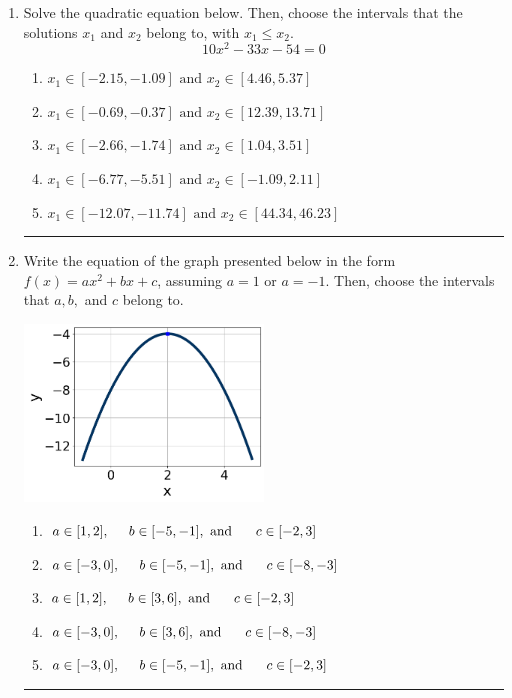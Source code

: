 \documentclass[14pt]{extbook}
\newcommand{\litem}[1]{\item#1\hspace*{-1cm}\rule{\textwidth}{0.4pt}}
\begin{document}
\begin{enumerate}
{\begin{enumerate}[label=\Alph*.]
\end{enumerate} }
\litem{
Solve the quadratic equation below. Then, choose the intervals that the solutions $x_1$ and $x_2$ belong to, with $x_1 \leq x_2$.\[ 10x^{2} -33 x -54 = 0 \]\begin{enumerate}[label=\Alph*.]
\item \( x_1 \in [-2.15, -1.09] \text{ and } x_2 \in [4.46, 5.37] \)
\item \( x_1 \in [-0.69, -0.37] \text{ and } x_2 \in [12.39, 13.71] \)
\item \( x_1 \in [-2.66, -1.74] \text{ and } x_2 \in [1.04, 3.51] \)
\item \( x_1 \in [-6.77, -5.51] \text{ and } x_2 \in [-1.09, 2.11] \)
\item \( x_1 \in [-12.07, -11.74] \text{ and } x_2 \in [44.34, 46.23] \)

\end{enumerate} }
\litem{
Write the equation of the graph presented below in the form $f(x)=ax^2+bx+c$, assuming  $a=1$ or $a=-1$. Then, choose the intervals that $a, b,$ and $c$ belong to.
\begin{center}
    \includegraphics[width=0.5\textwidth]{../Figures/quadraticGraphToEquationA.png}
\end{center}
\begin{enumerate}[label=\Alph*.]
\item \( a \in [1, 2], \hspace*{5mm} b \in [-5, -1], \text{ and } \hspace*{5mm} c \in [-2, 3] \)
\item \( a \in [-3, 0], \hspace*{5mm} b \in [-5, -1], \text{ and } \hspace*{5mm} c \in [-8, -3] \)
\item \( a \in [1, 2], \hspace*{5mm} b \in [3, 6], \text{ and } \hspace*{5mm} c \in [-2, 3] \)
\item \( a \in [-3, 0], \hspace*{5mm} b \in [3, 6], \text{ and } \hspace*{5mm} c \in [-8, -3] \)
\item \( a \in [-3, 0], \hspace*{5mm} b \in [-5, -1], \text{ and } \hspace*{5mm} c \in [-2, 3] \)


\end{enumerate}}
\end{enumerate}
\end{document}
